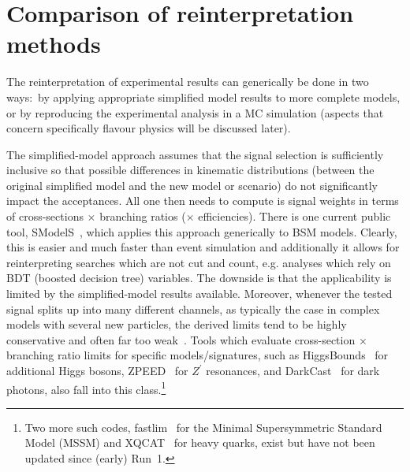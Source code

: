 \documentclass[a4paper,aps,prd,longbibliography,notitlepage,showpacs,amsmath,amssymb,superscriptaddress,nofootinbib,floatfix,11pt,preprintnumbers]{revtex4-1-mod}
\newcommand{\smodels}{\textsf{SModelS}\xspace}
\newcommand{\fastlim}{\textsf{fastlim}\xspace}
\newcommand{\darkcast}{\textsf{DarkCast}\xspace}
\newcommand{\higgsbounds}{\textsf{HiggsBounds}\xspace}
\newcommand{\zpeed}{\textsf{ZPEED}\xspace}
\newcommand{\eg}{e.g.\xspace}
\begin{document}
\section{Comparison of reinterpretation methods} \label{sec:codes}


The reinterpretation of experimental results can generically be done
in two ways:~by applying appropriate simplified model results to more complete models, or by reproducing the experimental analysis in a MC simulation (aspects that concern specifically flavour physics
will be discussed later).

The simplified-model approach assumes that the signal selection is sufficiently inclusive so that possible differences in kinematic distributions (between the original simplified model and the new model or scenario) do not significantly impact the acceptances. All one then needs
to compute is signal weights in terms of cross-sections $\times$ branching ratios ($\times$ efficiencies).
There is one current public tool, \smodels~\cite{Kraml:2013mwa,Ambrogi:2017neo,Ambrogi:2018ujg}, which applies this approach generically to BSM models.
Clearly, this is easier and much faster than event simulation and additionally it allows for reinterpreting searches which are not cut and count, \eg analyses which rely on BDT (boosted decision tree) variables.
The downside is that the applicability is limited by the simplified-model results available.
Moreover, whenever the tested signal splits up into many different channels, as typically the case in complex models with several new particles, the derived limits tend to be highly conservative and often far too weak~\cite{Ambrogi:2017lov,Chalons:2018gez}.
Tools which evaluate cross-section $\times$ branching ratio limits for specific models/signatures, such as \higgsbounds~\cite{Bechtle:2008jh,Bechtle:2013wla} for additional  Higgs bosons, \zpeed~\cite{Kahlhoefer:2019vhz} for $Z^\prime$ resonances, and \darkcast~\cite{Ilten:2018crw} for dark photons, also fall into this class.\footnote{Two more  such codes, \fastlim~\cite{Papucci:2014rja} for the Minimal Supersymmetric Standard Model (MSSM) and \textsf{XQCAT}~\cite{Barducci:2014gna} for heavy quarks, exist but have not been updated since (early) Run~1.}
\end{document}
